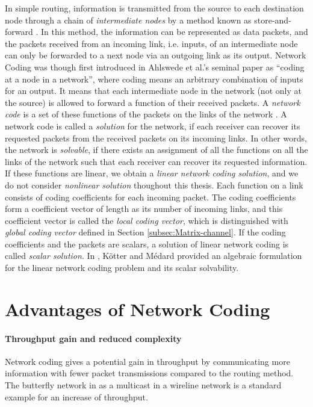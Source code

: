 In simple routing, information is transmitted from the source to each
destination node through a chain of \textit{intermediate nodes} by
a method known as store-and-forward \cite{Yeung:2006}. In this method,
the information can be represented as data packets, and the packets
received from an incoming link, i.e. inputs, of an intermediate node
can only be forwarded to a next node via an outgoing link as its output.
Network Coding was though first introduced in Ahlswede et al.'s seminal
paper as ``coding at a node in a network'', where coding means an
arbitrary combination of inputs for an output. It means that each
intermediate node in the network (not only at the source) is allowed
to forward a function of their received packets. A \textit{network
code} is a set of these functions of the packets on the links of the
network \cite{Wachter-Zeh:2018}. A network code is called a \textit{solution}
for the network, if each receiver can recover its requested packets
from the received packets on its incoming links. In other words, the
network is \textit{solvable}, if there exists an assignment of all
the functions on all the links of the network such that each receiver
can recover its requested information. If these functions are linear,
we obtain a \textit{linear network coding solution}, and we do not
consider \textit{nonlinear solution} thoughout this thesis. Each function
on a link consists of coding coefficients for each incoming packet.
The coding coefficients form a coefficient vector of length as its
number of incoming links, and this coefficient vector is called the
\textit{local coding vector}, which is distinguished with \textit{global
coding vector} defined in Section \ref{subsec:Matrix-channel}. If
the coding coefficients and the packets are scalars, a solution of
linear network coding is called \textit{scalar solution}. In \cite{Koetter:2003},
K\"otter and M\'edard provided an algebraic formulation for the linear
network coding problem and its scalar solvability. 

\section{Advantages of Network Coding}

\paragraph{Throughput gain and reduced complexity}

Network coding gives a potential gain in throughput by communicating
more information with fewer packet transmissions compared to the routing
method. The butterfly network in \cite{Ahlswede:2000} as a multicast
in a wireline network is a standard example for an increase of throughput. 

